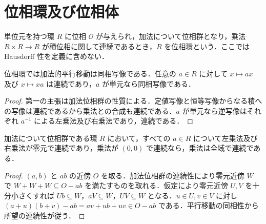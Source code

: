 \section{位相環及び位相体}
\begin{defn}[位相環]
単位元を持つ環 $R$ に位相 $\mathcal O$ が与えられ，加法について位相群となり，乗法 $R\times R\to R$ が積位相に関して連続であるとき，$R$ を位相環という．ここでは Hausdorff 性を定義に含めない．
\end{defn}
\begin{prop}[平行移動と単元による乗法]
位相環では加法的平行移動は同相写像である．任意の $a\in R$ に対して $x\mapsto ax$ 及び $x\mapsto xa$ は連続であり，$a$ が単元なら同相写像である．
\end{prop}
\begin{proof}
第一の主張は加法位相群の性質による．定値写像と恒等写像からなる積への写像は連続であるから乗法との合成も連続である．$a$ が単元なら逆写像はそれぞれ $a^{-1}$ による左乗法及び右乗法であり，連続である．
\end{proof}
\begin{prop}[零元近傍による乗法の連続性判定]
加法について位相群である環 $R$ において，すべての $a\in R$ について左乗法及び右乗法が零元で連続であり，乗法が $(0,0)$ で連続なら，乗法は全域で連続である．
\end{prop}
\begin{proof}
$(a,b)$ と $ab$ の近傍 $O$ を取る．加法位相群の連続性により零元近傍 $W$ で $W+W+W\subseteq O-ab$ を満たすものを取れる．仮定により零元近傍 $U,V$ を十分小さくすれば $Ub\subseteq W$，$aV\subseteq W$，$UV\subseteq W$ となる．$u\in U,v\in V$ に対し $(a+u)(b+v)-ab=av+ub+uv\in O-ab$ である．平行移動の同相性から所望の連続性が従う．
\end{proof}
